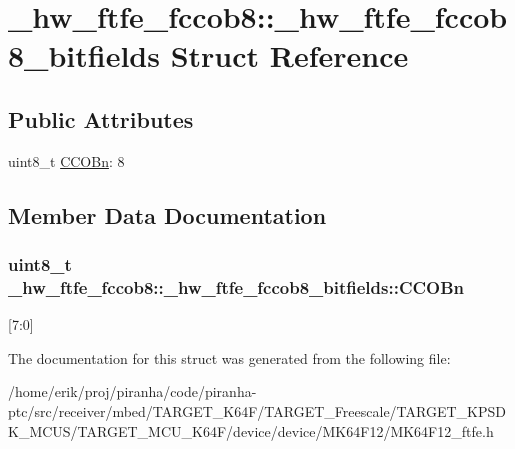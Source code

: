 \hypertarget{struct__hw__ftfe__fccob8_1_1__hw__ftfe__fccob8__bitfields}{}\section{\+\_\+hw\+\_\+ftfe\+\_\+fccob8\+:\+:\+\_\+hw\+\_\+ftfe\+\_\+fccob8\+\_\+bitfields Struct Reference}
\label{struct__hw__ftfe__fccob8_1_1__hw__ftfe__fccob8__bitfields}
\subsection*{Public Attributes}
\begin{DoxyCompactItemize}
\item 
uint8\+\_\+t \hyperlink{struct__hw__ftfe__fccob8_1_1__hw__ftfe__fccob8__bitfields_abf44ce6ce21c5d2c172c90172927ddb3}{C\+C\+O\+Bn}\+: 8
\end{DoxyCompactItemize}


\subsection{Member Data Documentation}
\subsubsection[{\texorpdfstring{C\+C\+O\+Bn}{CCOBn}}]{\setlength{\rightskip}{0pt plus 5cm}uint8\+\_\+t \+\_\+hw\+\_\+ftfe\+\_\+fccob8\+::\+\_\+hw\+\_\+ftfe\+\_\+fccob8\+\_\+bitfields\+::\+C\+C\+O\+Bn}\hypertarget{struct__hw__ftfe__fccob8_1_1__hw__ftfe__fccob8__bitfields_abf44ce6ce21c5d2c172c90172927ddb3}{}\label{struct__hw__ftfe__fccob8_1_1__hw__ftfe__fccob8__bitfields_abf44ce6ce21c5d2c172c90172927ddb3}
\mbox{[}7\+:0\mbox{]} 

The documentation for this struct was generated from the following file\+:\begin{DoxyCompactItemize}
\item 
/home/erik/proj/piranha/code/piranha-\/ptc/src/receiver/mbed/\+T\+A\+R\+G\+E\+T\+\_\+\+K64\+F/\+T\+A\+R\+G\+E\+T\+\_\+\+Freescale/\+T\+A\+R\+G\+E\+T\+\_\+\+K\+P\+S\+D\+K\+\_\+\+M\+C\+U\+S/\+T\+A\+R\+G\+E\+T\+\_\+\+M\+C\+U\+\_\+\+K64\+F/device/device/\+M\+K64\+F12/M\+K64\+F12\+\_\+ftfe.\+h\end{DoxyCompactItemize}
